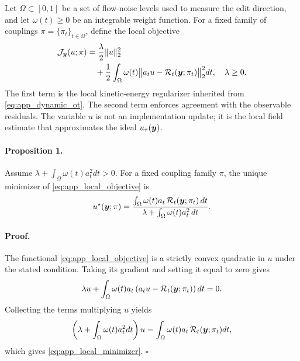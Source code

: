Let $\Omega\subset[0,1]$ be a set of flow-noise levels used to measure the edit direction, and let $\omega(t)\ge 0$ be an integrable weight function.
For a fixed family of couplings $\pi=\{\pi_t\}_{t\in\Omega}$, define the local objective
\begin{equation}
    \label{eq:app_local_objective}
    \begin{aligned}
    \mathcal{J}_{\boldsymbol{y}}(u;\pi)
    &=
    \frac{\lambda}{2}\|u\|_2^2
    \\
    &\quad+
    \frac{1}{2}
    \int_{\Omega}
    \omega(t)
    \big\|
    a_t u-\mathcal{R}_t(\boldsymbol{y};\pi_t)
    \big\|_2^2
    dt,
    \quad \lambda\ge 0.
    \end{aligned}
\end{equation}
The first term is the local kinetic-energy regularizer inherited from \eqref{eq:app_dynamic_ot}.
The second term enforces agreement with the observable residuals.
The variable $u$ is not an implementation update; it is the local field estimate that approximates the ideal $u_\tau(\boldsymbol{y})$.

\paragraph{Proposition 1.}
Assume $\lambda+\int_\Omega\omega(t)a_t^2dt>0$.
For a fixed coupling family $\pi$, the unique minimizer of \eqref{eq:app_local_objective} is
\begin{equation}
    \label{eq:app_local_minimizer}
    u^\star(\boldsymbol{y};\pi)
    =
    \frac{
    \int_{\Omega}\omega(t)a_t\,\mathcal{R}_t(\boldsymbol{y};\pi_t)\,dt
    }{
    \lambda+\int_{\Omega}\omega(t)a_t^2\,dt
    }.
\end{equation}

\paragraph{Proof.}
The functional \eqref{eq:app_local_objective} is a strictly convex quadratic in $u$ under the stated condition.
Taking its gradient and setting it equal to zero gives
\begin{equation}
    \label{eq:app_normal_equation}
    \lambda u
    +
    \int_\Omega
    \omega(t)a_t
    \left(
    a_t u-\mathcal{R}_t(\boldsymbol{y};\pi_t)
    \right)
    dt
    =
    0.
\end{equation}
Collecting the terms multiplying $u$ yields
\begin{equation}
    \left(
    \lambda+\int_\Omega\omega(t)a_t^2dt
    \right)u
    =
    \int_\Omega
    \omega(t)a_t\,\mathcal{R}_t(\boldsymbol{y};\pi_t)dt,
\end{equation}
which gives \eqref{eq:app_local_minimizer}.
\hfill$\square$

